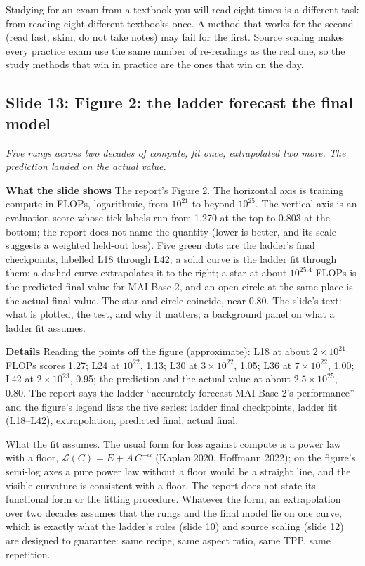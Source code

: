 \documentclass[11pt,letterpaper]{article}
\newcommand{\slide}[3]{%
  \subsection[Slide #1: #2]{Slide #1: #2}%
  {\color{muted}\itshape #3\par}\medskip}
\newcommand{\para}[1]{\medskip\noindent\textbf{#1}\quad}
\newenvironment{intuition}{\begin{tcolorbox}[intuitionbox]}{\end{tcolorbox}}
\begin{document}
\begin{intuition}
Studying for an exam from a textbook you will read eight times is a different task from reading eight different textbooks once. A method that works for the second (read fast, skim, do not take notes) may fail for the first. Source scaling makes every practice exam use the same number of re-readings as the real one, so the study methods that win in practice are the ones that win on the day.
\end{intuition}

\slide{13}{Figure 2: the ladder forecast the final model}{Five rungs across two decades of compute, fit once, extrapolated two more. The prediction landed on the actual value.}

\para{What the slide shows} The report's Figure 2. The horizontal axis is training compute in FLOPs, logarithmic, from $10^{21}$ to beyond $10^{25}$. The vertical axis is an evaluation score whose tick labels run from 1.270 at the top to 0.803 at the bottom; the report does not name the quantity (lower is better, and its scale suggests a weighted held-out loss). Five green dots are the ladder's final checkpoints, labelled L18 through L42; a solid curve is the ladder fit through them; a dashed curve extrapolates it to the right; a star at about $10^{25.4}$ FLOPs is the predicted final value for MAI-Base-2, and an open circle at the same place is the actual final value. The star and circle coincide, near 0.80. The slide's text: what is plotted, the test, and why it matters; a background panel on what a ladder fit assumes.

\para{Details} Reading the points off the figure (approximate): L18 at about $2\times10^{21}$ FLOPs scores 1.27; L24 at $10^{22}$, 1.13; L30 at $3\times10^{22}$, 1.05; L36 at $7\times10^{22}$, 1.00; L42 at $2\times10^{23}$, 0.95; the prediction and the actual value at about $2.5\times10^{25}$, 0.80. The report says the ladder ``accurately forecast MAI-Base-2's performance'' and the figure's legend lists the five series: ladder final checkpoints, ladder fit (L18--L42), extrapolation, predicted final, actual final.

What the fit assumes. The usual form for loss against compute is a power law with a floor, $\mathcal{L}(C)=E+A\,C^{-\alpha}$ (Kaplan 2020, Hoffmann 2022); on the figure's semi-log axes a pure power law without a floor would be a straight line, and the visible curvature is consistent with a floor. The report does not state its functional form or the fitting procedure. Whatever the form, an extrapolation over two decades assumes that the rungs and the final model lie on one curve, which is exactly what the ladder's rules (slide 10) and source scaling (slide 12) are designed to guarantee: same recipe, same aspect ratio, same TPP, same repetition.
\end{document}
